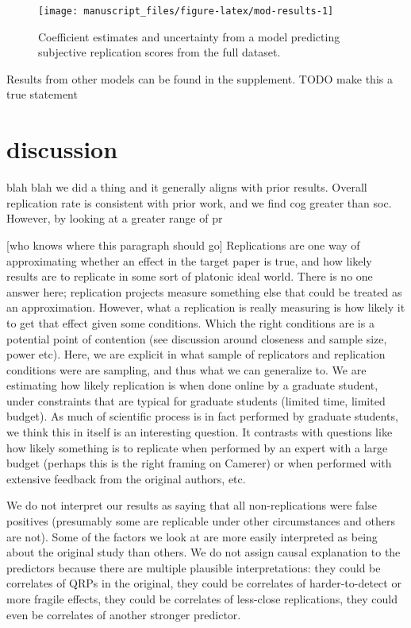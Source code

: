 \documentclass[
  english,
  a4paper,
]{article}
\begin{document}
\begin{figure}[ht]
\texttt{[image: manuscript\_files/figure-latex/mod-results-1]} \caption{Coefficient estimates and uncertainty from a model predicting subjective replication scores from the full dataset.}\label{fig:mod-results}
\end{figure}

Results from other models can be found in the supplement. TODO make this a true statement

\hypertarget{discussion}{%
\section{discussion}\label{discussion}}

blah blah we did a thing and it generally aligns with prior results. Overall replication rate is consistent with prior work, and we find cog greater than soc. However, by looking at a greater range of pr

{[}who knows where this paragraph should go{]} Replications are one way of approximating whether an effect in the target paper is true, and how likely results are to replicate in some sort of platonic ideal world. There is no one answer here; replication projects measure something else that could be treated as an approximation. However, what a replication is really measuring is how likely it to get that effect given some conditions. Which the right conditions are is a potential point of contention (see discussion around closeness and sample size, power etc). Here, we are explicit in what sample of replicators and replication conditions were are sampling, and thus what we can generalize to. We are estimating how likely replication is when done online by a graduate student, under constraints that are typical for graduate students (limited time, limited budget). As much of scientific process is in fact performed by graduate students, we think this in itself is an interesting question. It contrasts with questions like how likely something is to replicate when performed by an expert with a large budget (perhaps this is the right framing on Camerer) or when performed with extensive feedback from the original authors, etc.

We do not interpret our results as saying that all non-replications were false positives (presumably some are replicable under other circumstances and others are not). Some of the factors we look at are more easily interpreted as being about the original study than others. We do not assign causal explanation to the predictors because there are multiple plausible interpretations: they could be correlates of QRPs in the original, they could be correlates of harder-to-detect or more fragile effects, they could be correlates of less-close replications, they could even be correlates of another stronger predictor.
\end{document}
